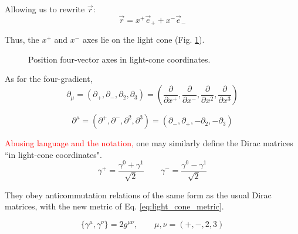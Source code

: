 Allowing us to rewrite $\vec{r}$:
\begin{equation}
  \vec{r} =  x^+ \vec{e}_+ + x^- \vec{e}_-
\end{equation}

Thus, the $x^+$ and $x^-$ axes lie on the light cone (Fig. \ref{fig:light_cone}).


\begin{figure}\centering
  \caption{Position four-vector axes in light-cone coordinates.}
\label{fig:light_cone}\end{figure}

As for the four-gradient,
\begin{equation}
  \partial_\mu = (\partial_+, \partial_-, \partial_2, \partial_3) = \left( \frac{\partial}{\partial x^+}, \frac{\partial}{\partial x^-}, \frac{\partial}{\partial x^2}, \frac{\partial}{\partial x^3} \right)
\end{equation}

\begin{equation}
  \partial^\mu = (\partial^+, \partial^-, \partial^2, \partial^3) = (\partial_-, \partial_+, -\partial_2, -\partial_3)
\end{equation}


\textcolor{red}{Abusing language and the notation,} one may similarly define the Dirac matrices ``in light-cone coordinates".
\begin{equation}
  \gamma^+ = \frac{\gamma^0 + \gamma^1}{\sqrt{2}} \qquad \gamma^- = \frac{\gamma^0 - \gamma^1}{\sqrt{2}}
\end{equation}

They obey anticommutation relations of the same form as the usual Dirac matrices, with the new metric of Eq. \ref{eq:light_cone_metric}.

\begin{equation}
  \{ \gamma^\mu, \gamma^\nu \} = 2g^{\mu \nu}, \qquad \mu,\nu = (+,-,2,3)
\end{equation}


